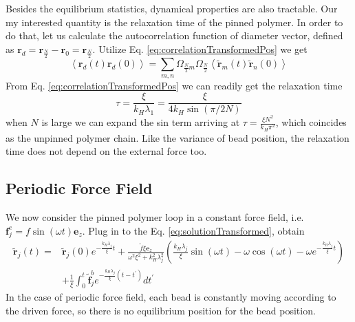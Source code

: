 \documentclass[12pt,a4paper]{article}
\begin{document}
Besides the equilibrium statistics, dynamical properties are also tractable.
Our my interested quantity is the relaxation time of the pinned polymer. In
order to do that, let us calculate the autocorrelation function of diameter
vector, defined as $\mathbf{r}_d = \mathbf{r}_{\frac{N}{2}} - \mathbf{r}_0 =
\mathbf{r}_{\frac{N}{2}}$. Utilize Eq. \eqref{eq:correlationTransformedPos} we
get
\begin{equation}
    \label{eq:diameterVectorCorrelation}
    \left<\mathbf{r}_d(t)\mathbf{r}_d(0)\right> = 
    \sum_{m,n}\Omega_{\frac{N}{2}m}\Omega_{\frac{N}{2}}
    \left<\tilde{\mathbf{r}}_m(t)\tilde{\mathbf{r}}_n(0)\right>
\end{equation}
From Eq. \eqref{eq:correlationTransformedPos} we can readily get the relaxation
time 
\begin{equation}
    \label{eq:relaxationTime}
    \tau = \frac{\xi}{k_H\lambda_1} = \frac{\xi}{4k_H\sin(\pi/2N)}
\end{equation}
when $N$ is large we can expand the sin term arriving at $\tau = \frac{\xi
    N^2}{k_H \pi^2}$, which coincides as the unpinned polymer chain. Like
the variance of bead position, the relaxation time does not depend on the
external force too. 

\subsection{Periodic Force Field}
\label{sub:periodic_force_field}
We now consider the pinned polymer loop in a constant force field, i.e.
$\mathbf{f}_j^e = f\sin(\omega t)\mathbf{e}_z$. Plug in to the Eq.
\eqref{eq:solutionTransformed}, obtain
\begin{equation}
    \begin{aligned}
        \label{eq:solutionTransformedPeriodic}
        \tilde{\mathbf{r}}_j(t) = & \tilde{\mathbf{r}}_j(0) e^{-\frac{k_H
                \lambda_j}{\xi} t} +
        \frac{\tilde{f}\xi\mathbf{e}_z}{\omega^2\xi^2+k_H^2\lambda_j^2
        }\left(\frac{k_H \lambda_j}{\xi}\sin(\omega t)-\omega\cos(\omega
            t)-\omega e^{-\frac{k_H \lambda_j}{\xi} t} \right) \\ 
        & + \frac{1}{\xi} \int^t_0{\tilde{\mathbf{f}}^b_j e^{-\frac{k_H
                    \lambda_j}{\xi} (t -t^\prime)} }dt^{\prime}
    \end{aligned}
\end{equation}
In the case of periodic force field, each bead is constantly moving according
to the driven force, so there is no equilibrium position for the bead position.
\end{document}
